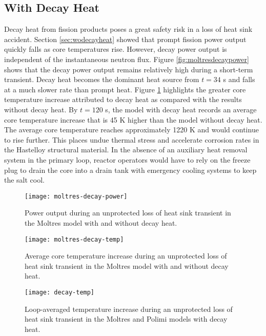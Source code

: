\clearpage

\subsection{With Decay Heat}

Decay heat from fission products poses a great safety risk in a loss of
heat sink accident. Section \ref{sec:wodecayheat} showed that prompt fission
power output quickly falls as core temperatures rise. However, decay power
output is independent of the instantaneous neutron flux. Figure
\ref{fig:moltresdecaypower} shows that the decay power output remains
relatively high during a short-term transient. Decay heat becomes the dominant
heat source from $t=34$ s and falls at a much slower rate than prompt heat.
Figure \ref{fig:moltresdecaytemp} highlights the
greater core temperature increase attributed to decay heat as compared with
the results without decay heat. By $t=120$ s, the model with decay heat
records an average core temperature increase that is 45 K higher than the
model without decay heat. The average core temperature reaches approximately
1220 K and would continue to rise further. This places undue thermal stress
and accelerate corrosion rates in the Hastelloy structural material. In the
absence of an auxiliary heat removal system in the primary loop, reactor
operators would have to rely on the freeze plug to drain the core into a drain
tank with emergency cooling systems to keep the salt cool.

\begin{figure}[htbp!]
    \centering
    \texttt{[image: moltres-decay-power]}
    \caption{Power output during
    an unprotected loss of heat sink transient in the Moltres model with and
    without decay heat.}
    \label{fig:moltresdecaypower}
    \texttt{[image: moltres-decay-temp]}
    \caption{Average core temperature increase during
    an unprotected loss of heat sink transient in the Moltres model with and
    without decay heat.}
    \label{fig:moltresdecaytemp}
\end{figure}

\begin{figure}[htbp!]
    \centering
    \texttt{[image: decay-temp]}
    \caption{Loop-averaged temperature increase during
    an unprotected loss of heat sink transient in the Moltres and Polimi
    models \cite{fiorina_modelling_2014} with decay heat.}
    \label{fig:polimidecaytemp}
\end{figure}

